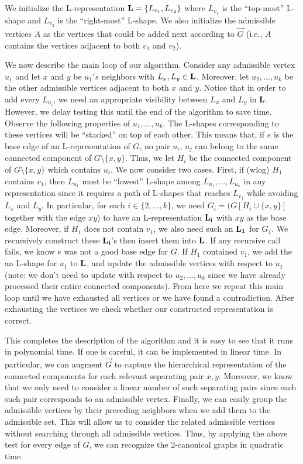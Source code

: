 \documentclass{llncs}
\begin{document}
We initialize the L-representation ${\bf L} = \{L_{v_1}, L_{v_2}\}$ where $L_{v_1}$ is the ``top-most'' L-shape and $L_{v_2}$ is the ``right-most'' L-shape. We also initialize the admissible vertices $A$ as the vertices that could be added next according to $\overrightarrow{G}$ (i.e., $A$ contains the vertices adjacent to both $v_1$ and $v_2$). 

We now describe the main loop of our algorithm. Consider any admissible vertex $u_1$ and let $x$ and $y$ be $u_1's$ neighbors with $L_x, L_y \in {\bf L}$. Moreover, let $u_2, ..., u_k$ be the other admissible vertices adjacent to both $x$ and $y$. Notice that in order to add every $L_{u_i}$, we need an appropriate visibility between $L_x$ and $L_y$ in $\bf{L}$. However, we delay testing this until the end of the algorithm to save time. Observe the following properties of $u_1, \ldots, u_k$. The L-shapes corresponding to these vertices will be ``stacked'' on top of each other. This means that, if $e$ is the base edge of an L-representation of $G$, no pair $u_i$, $u_j$ can belong to the same connected component of $G \setminus \{x,y\}$. Thus, we let $H_i$ be the connected component of $G \setminus \{x,y\}$ which contains $u_i$. We now consider two cases. First, if (wlog) $H_1$ contains $v_1$, then $L_{u_1}$ must be ``lowest'' L-shape among $L_{u_1}, \ldots, L_{u_k}$ in any representation since it requires a path of L-shapes that reaches $L_{v_1}$ while avoiding $L_x$ and $L_y$. 
In particular, for each $i \in \{2, \ldots, k\}$,  we need $G_i = (G[H_i \cup \{x,y\}]$ together with the edge $xy$) to have an L-representation ${\bf L_i}$ with $xy$ as the base edge. Moreover, if $H_1$ does not contain $v_1$, we also need such an ${\bf L_1}$ for $G_1$. We recursively construct these $\bf{L_i}$'s then insert them into $\bf{L}$. 
If any recursive call fails, we know $e$ was not a good base edge for $G$. If $H_1$ contained $v_1$, we add the an L-shape for $u_1$ to $\bf{L}$, and update the admissible vertices with respect to $u_1$ (note: we don't need to update with respect to $u_2, \ldots, u_k$ since we have already processed their entire connected components). From here we repeat this main loop until we have exhausted all vertices or we have found a contradiction. After exhausting the vertices we check whether our constructed representation is correct. 

This completes the description of the algorithm and it is easy to see that it runs in polynomial time.
If one is careful, it can be implemented in linear time. In particular, we can augment $\overrightarrow{G}$ to capture the hierarchical representation of the connected components for each relevant separating pair $x,y$. Moreover, we know that we only need to consider a linear number of such separating pairs since each such pair corresponds to an admissible vertex. Finally, we can easily group the admissible vertices by their preceding neighbors when we add them to the admissible set. This will allow us to consider the related admissible vertices without searching through all admissible vertices. 
Thus, by applying the above test for every edge of $G$, we can recognize the 2-canonical graphs in quadratic time. 
\end{document}
